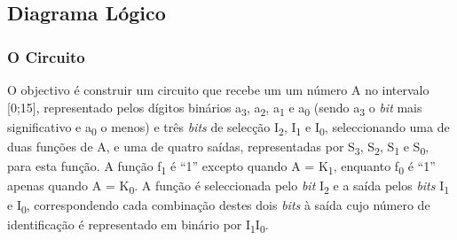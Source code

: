 \documentclass[a4paper,12pt]{article}
\begin{document}
\subsection{Diagrama Lógico}
\subsubsection{O Circuito}
O objectivo é construir um circuito que recebe um um número A no intervalo 
[0;15], representado pelos dígitos binários a\textsubscript{3}, 
a\textsubscript{2}, a\textsubscript{1} e a\textsubscript{0} (sendo 
a\textsubscript{3} o {\it bit} mais significativo e a\textsubscript{0} o menos) 
e três {\it bits} de selecção I\textsubscript{2}, I\textsubscript{1} e 
I\textsubscript{0}, seleccionando uma de duas funções de A, e uma de quatro 
saídas, representadas por S\textsubscript{3}, S\textsubscript{2}, 
S\textsubscript{1} e S\textsubscript{0}, para esta função. A função 
f\textsubscript{1} é ``1'' excepto quando A = K\textsubscript{1}, enquanto 
f\textsubscript{0} é ``1'' apenas quando A = K\textsubscript{0}. A 
função é seleccionada pelo {\it bit} I\textsubscript{2} e a saída pelos 
{\it bits} I\textsubscript{1} e I\textsubscript{0}, correspondendo cada 
combinação destes dois {\it bits} à saída cujo número de identificação 
é representado em binário por I\textsubscript{1}I\textsubscript{0}.
\par
\end{document}
